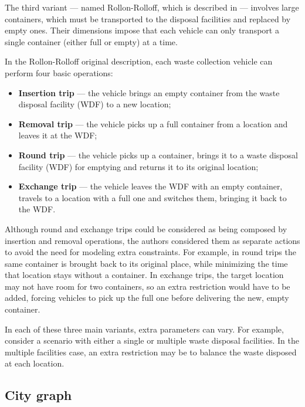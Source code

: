 The third variant --- named Rollon-Rolloff, which is described in
\citet{Bodin00} --- involves large containers, which must be transported
to the disposal facilities and replaced by empty ones. Their dimensions impose
that each vehicle can only transport a single container (either full or empty)
at a time. 

In the Rollon-Rolloff original description, each waste collection vehicle can
perform four basic operations:

\begin{itemize}
\item \textbf{Insertion trip} --- the vehicle brings an empty container from
the waste disposal facility (WDF) to a new location;

\item \textbf{Removal trip} --- the vehicle picks up a full container from a
location and leaves it at the WDF;

\item \textbf{Round trip} --- the vehicle picks up a container, brings it to a
waste disposal facility (WDF) for emptying and returns it to its original
location;

\item \textbf{Exchange trip} --- the vehicle leaves the WDF with an empty
container, travels to a location with a full one and switches them, bringing it
back to the WDF.
\end{itemize}

Although round and exchange trips could be considered as being composed by
insertion and removal operations, the authors considered them as separate
actions to avoid the need for modeling extra constraints. For example, in
round trips the same container is brought back to its original place, while
minimizing the time that location stays without a container. In exchange
trips, the target location may not have room for two containers, so an
extra restriction would have to be added, forcing vehicles to pick up the full
one before delivering the new, empty container.

In each of these three main variants, extra parameters can vary. For example,
consider a scenario with either a single or multiple waste disposal facilities.
In the multiple facilities case, an extra restriction may be to balance the
waste disposed at each location.


\subsection{City graph}
\label{section:city-graph}

